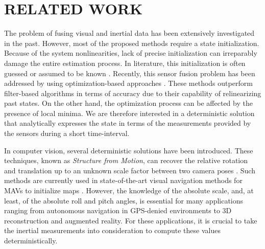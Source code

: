 \documentclass[letterpaper, 10 pt, journal, final]{ieeeconf}  %
\begin{document}

\section{RELATED WORK}

The problem of fusing visual and inertial data has been extensively investigated in the past.
However, most of the proposed methods require a state initialization.
Because of the system nonlinearities, lack of precise initialization can irreparably damage the entire estimation process.
In literature, this initialization is often guessed or assumed to be known \cite{Armesto2007}\cite{Li2013}\cite{Huang2009}\cite{Bibuli2007}\cite{Forster2014}. Recently, this sensor fusion problem has been addressed by using optimization-based approaches \cite{Leute2014}\cite{Forster2015}\cite{mourikis2008dual}\cite{lupton2012visual}\cite{huang2011observability}\cite{mourikis2007multi}. These methods outperform filter-based algorithms in terms of accuracy due to their capability of relinearizing past states. On the other hand, the optimization process can be affected by the presence of local minima.
We are therefore interested in a deterministic solution that analytically expresses the state in terms of the measurements provided by the sensors during a short time-interval.

In computer vision, several deterministic solutions have been introduced.
These techniques, known as {\it Structure from Motion}, can recover the relative rotation and translation up to an unknown scale factor between two camera poses \cite{Longuet-Higgins1981}\cite{Hartley1997}\cite{Nister2003}\cite{Hartley2004}\cite{Li2006}.
Such methods are currently used in state-of-the-art visual navigation methods for MAVs to initialize maps \cite{Weiss2012}\cite{Forster2014}\cite{FaesslerICRA15}.
However, the knowledge of the absolute scale, and, at least, of the absolute roll and pitch angles, is essential for many applications ranging from autonomous navigation in GPS-denied environments to 3D reconstruction and augmented reality.
For these applications, it is crucial to take the inertial measurements into consideration to compute these values deterministically.
\end{document}
